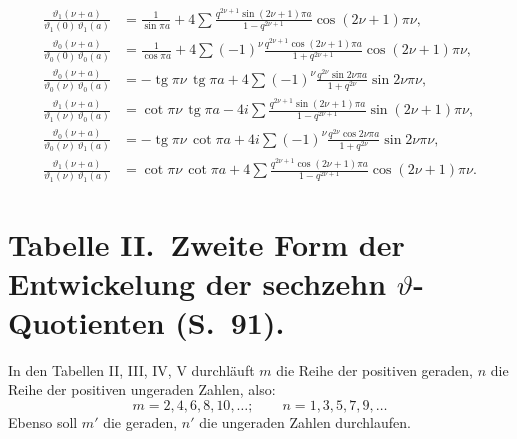 \documentclass[12pt,a4paper]{article}
\DeclareMathOperator{\tg}{tg}
\begin{document}
\begin{align*}
\frac{\vartheta_1(\nu+a)}{\vartheta_1(0)\,\vartheta_1(a)} &= \frac{1}{\sin\pi a} + 4\sum \frac{q^{2\nu+1} \sin(2\nu+1)\pi a}{1-q^{2\nu+1}} \cos(2\nu+1)\pi\nu,\\
\frac{\vartheta_0(\nu+a)}{\vartheta_0(0)\,\vartheta_0(a)} &= \frac{1}{\cos\pi a} + 4\sum (-1)^{\nu} \frac{q^{2\nu+1} \cos(2\nu+1)\pi a}{1+q^{2\nu+1}} \cos(2\nu+1)\pi\nu,\\
\frac{\vartheta_0(\nu+a)}{\vartheta_0(\nu)\,\vartheta_0(a)} &= -\tg\pi\nu\,\tg\pi a + 4\sum (-1)^{\nu} \frac{q^{2\nu} \sin 2\nu\pi a}{1+q^{2\nu}} \sin 2\nu\pi\nu,\\
\frac{\vartheta_1(\nu+a)}{\vartheta_1(\nu)\,\vartheta_0(a)} &= \cot\pi\nu\,\tg\pi a - 4i\sum \frac{q^{2\nu+1} \sin(2\nu+1)\pi a}{1-q^{2\nu+1}} \sin(2\nu+1)\pi\nu,\\
\frac{\vartheta_0(\nu+a)}{\vartheta_0(\nu)\,\vartheta_1(a)} &= -\tg\pi\nu\,\cot\pi a + 4i\sum (-1)^{\nu} \frac{q^{2\nu} \cos 2\nu\pi a}{1+q^{2\nu}} \sin 2\nu\pi\nu,\\
\frac{\vartheta_1(\nu+a)}{\vartheta_1(\nu)\,\vartheta_1(a)} &= \cot\pi\nu\,\cot\pi a + 4\sum \frac{q^{2\nu+1} \cos(2\nu+1)\pi a}{1-q^{2\nu+1}} \cos(2\nu+1)\pi\nu.
\end{align*}

\newpage
\section*{Tabelle II.\ Zweite Form der Entwickelung der sechzehn $\vartheta$-Quotienten (S.~91).}

In den Tabellen II, III, IV, V durchläuft $m$ die Reihe der positiven geraden, $n$ die Reihe der positiven ungeraden Zahlen, also:
\[
m = 2, 4, 6, 8, 10, \ldots; \qquad n = 1, 3, 5, 7, 9, \ldots
\]
Ebenso soll $m'$ die geraden, $n'$ die ungeraden Zahlen durchlaufen.
\end{document}
